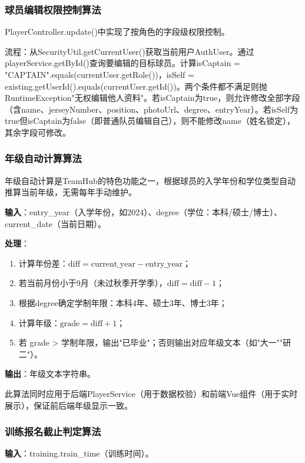 \documentclass[12pt,a4paper]{ctexart}
\begin{document}
\subsubsection{球员编辑权限控制算法}

PlayerController.update()中实现了按角色的字段级权限控制。

流程：从SecurityUtil.getCurrentUser()获取当前用户AuthUser。通过playerService.getById()查询要编辑的目标球员。计算isCaptain = "CAPTAIN".equals(currentUser.getRole())，isSelf = existing.getUserId().equals(currentUser.getId())。两个条件都不满足则抛RuntimeException"无权编辑他人资料"。若isCaptain为true，则允许修改全部字段（含name、jerseyNumber、position、photoUrl、degree、entryYear）。若isSelf为true但isCaptain为false（即普通队员编辑自己），则不能修改name（姓名锁定），其余字段可修改。

\subsubsection{年级自动计算算法}

年级自动计算是TeamHub的特色功能之一，根据球员的入学年份和学位类型自动推算当前年级，无需每年手动维护。

\textbf{输入}：entry\_year（入学年份，如2024）、degree（学位：本科/硕士/博士）、current\_date（当前日期）。

\textbf{处理}：
\begin{enumerate}[label=(\arabic*)]
\item 计算年份差：$\text{diff} = \text{current\_year} - \text{entry\_year}$；
\item 若当前月份小于9月（未过秋季开学季），$\text{diff} = \text{diff} - 1$；
\item 根据degree确定学制年限：本科4年、硕士3年、博士3年；
\item 计算年级：$\text{grade} = \text{diff} + 1$；
\item 若 grade > 学制年限，输出"已毕业"；否则输出对应年级文本（如"大一""研二"）。
\end{enumerate}

\textbf{输出}：年级文本字符串。

此算法同时应用于后端PlayerService（用于数据校验）和前端Vue组件（用于实时展示），保证前后端年级显示一致。

\subsubsection{训练报名截止判定算法}

\textbf{输入}：training.train\_time（训练时间）。
\end{document}
